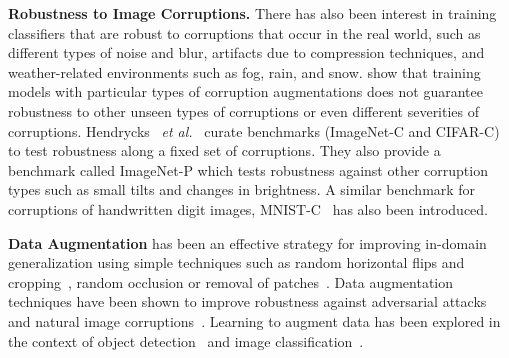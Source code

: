 \textbf{Robustness to Image Corruptions.}
There has also been interest in training classifiers that are robust to corruptions that occur in the real world, such as different types of noise and blur, artifacts due to compression techniques, and weather-related environments such as fog, rain, and snow.
\citep{vasiljevic2016examining,geirhos2018generalisation} show that training models with particular types of corruption augmentations does not guarantee robustness to other unseen types of corruptions or even different severities of corruptions. 
Hendrycks~ \textit{et al.}~\citep{hendrycks2018benchmarking} curate benchmarks (ImageNet-C and CIFAR-C) to test robustness along a fixed set of corruptions.
They also provide a benchmark called ImageNet-P which tests robustness against other corruption types such as small tilts and changes in brightness.
A similar benchmark for corruptions of handwritten digit images, MNIST-C~\citep{mu2019mnist} has also been introduced.


\textbf{Data Augmentation}
has been an effective strategy for improving in-domain generalization using simple techniques such as random horizontal flips and cropping~\citep{he2016deep}, random occlusion or removal of patches~\citep{devries2017improved,zhong2020random}.
Data augmentation techniques have been shown to improve robustness against adversarial attacks and natural image corruptions~\citep{zhang2018mixup,yun2019cutmix,cubuk2020randaugment}.
Learning to augment data has been explored in the context of object detection~\citep{zoph2020learning} and image classification~\citep{ratner2017learning,cubuk2019autoaugment,zhang2019adversarial}. 




